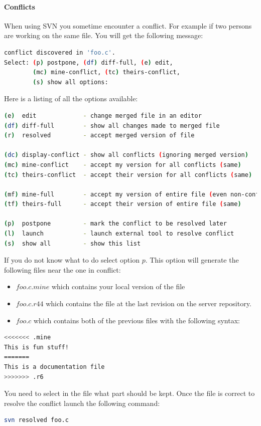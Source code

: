 \paragraph{Conflicts}
\label{conflict}
When using SVN you sometime encounter a conflict. For example if two persons
are working on the same file. You will get the following message:
\begin{lstlisting}[language=bash]
conflict discovered in 'foo.c'.
Select: (p) postpone, (df) diff-full, (e) edit,
        (mc) mine-conflict, (tc) theirs-conflict,
        (s) show all options:
\end{lstlisting}
Here is a listing of all the options available:
\begin{lstlisting}[language=bash]
(e)  edit             - change merged file in an editor
(df) diff-full        - show all changes made to merged file
(r)  resolved         - accept merged version of file

(dc) display-conflict - show all conflicts (ignoring merged version)
(mc) mine-conflict    - accept my version for all conflicts (same)
(tc) theirs-conflict  - accept their version for all conflicts (same)

(mf) mine-full        - accept my version of entire file (even non-conflicts)
(tf) theirs-full      - accept their version of entire file (same)

(p)  postpone         - mark the conflict to be resolved later
(l)  launch           - launch external tool to resolve conflict
(s)  show all         - show this list
\end{lstlisting}
%
If you do not know what to do select option $p$. This option will generate the
following files near the one in conflict:
\begin{itemize}
\item $foo.c.mine$ which contains your local version of the file
\item $foo.c.r44$ which contains the file at the last revision on the server
repository.
\item $foo.c$ which contains both of the previous files with the following
syntax:
\end{itemize}
\begin{lstlisting}[language=bash]
<<<<<<< .mine
This is fun stuff!
=======
This is a documentation file
>>>>>>> .r6
\end{lstlisting}
You need to select in the file what part should be kept. Once the file is
correct to resolve the conflict launch the following command:
\begin{lstlisting}[language=bash]
svn resolved foo.c
\end{lstlisting}
